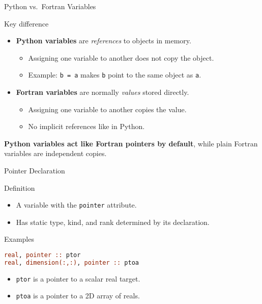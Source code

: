 \begin{frame}{Python vs.~Fortran Variables}
  \begin{block}{Key difference}
    \begin{itemize}
      \item \textbf{Python variables} are \emph{references} to objects in memory.
        \begin{itemize}
          \item Assigning one variable to another does not copy the object.
          \item Example: \texttt{b = a} makes \texttt{b} point to the same object as \texttt{a}.
        \end{itemize}
      \item \textbf{Fortran variables} are normally \emph{values} stored directly.
        \begin{itemize}
          \item Assigning one variable to another copies the value.
          \item No implicit references like in Python.
        \end{itemize}
    \end{itemize}
  \end{block}

  \textbf{Python variables act like Fortran pointers by default}, while plain Fortran variables are independent copies.

\end{frame}


\begin{frame}[fragile]{Pointer Declaration}
  \begin{block}{Definition}
    \begin{itemize}
      \item A variable with the \texttt{pointer} attribute.
      \item Has static type, kind, and rank determined by its declaration.
    \end{itemize}
  \end{block}

  \begin{block}{Examples}
\begin{lstlisting}[language=Fortran]
real, pointer :: ptor
real, dimension(:,:), pointer :: ptoa
\end{lstlisting}
    \begin{itemize}
      \item \texttt{ptor} is a pointer to a scalar real target.
      \item \texttt{ptoa} is a pointer to a 2D array of reals.
    \end{itemize}
  \end{block}
\end{frame}


